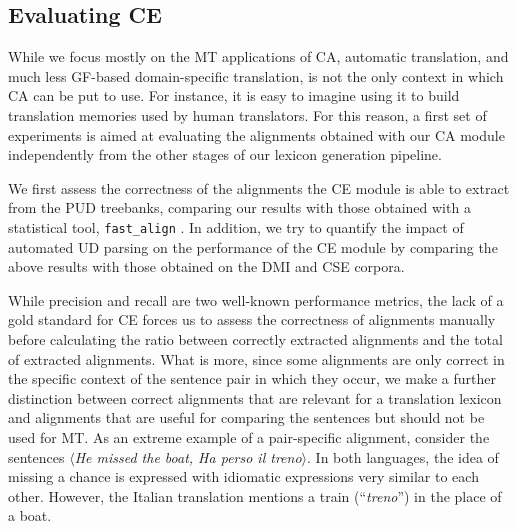 \documentclass[11pt]{article}
\begin{document}
\subsection{Evaluating CE} \label{ceval}
While we focus mostly on the MT applications of CA, automatic translation, and much less GF-based domain-specific translation, is not the only context in which CA can be put to use. 
For instance, it is easy to imagine using it to build translation memories used by human translators.
For this reason, a first set of experiments is aimed at evaluating the alignments obtained with our CA module independently from the other stages of our lexicon generation pipeline.

We first assess the correctness of the alignments the CE module is able to extract from the PUD treebanks, comparing our results with those obtained with a statistical tool, \texttt{fast\_align} \cite{dyer-etal-2013-simple}. 
In addition, we try to quantify the impact of automated UD parsing on the performance of the CE module by comparing the above results with those obtained on the DMI and CSE corpora.

While precision and recall are two well-known performance metrics, the lack of a gold standard for CE forces us to assess the correctness of alignments manually before calculating the ratio between correctly extracted alignments and the total of extracted alignments.
What is more, since some alignments are only correct in the specific context of the sentence pair in which they occur, we make a further distinction between correct alignments that are relevant for a translation lexicon and alignments that are useful for comparing the sentences but should not be used for MT. 
As an extreme example of a pair-specific alignment, consider the sentences $\langle$\textit{He missed the boat, Ha perso il treno}$\rangle$. 
In both languages, the idea of missing a chance is expressed with idiomatic expressions very similar to each other. 
However, the Italian translation mentions a train (``\textit{treno}'') in the place of a boat.
\end{document}
